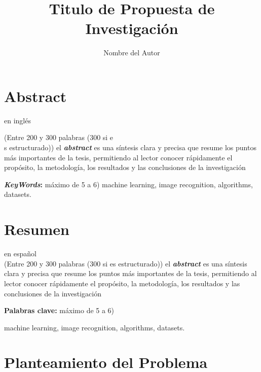 \documentclass[a4paper,12pt]{article}
\author{Nombre del Autor}
\title{Titulo de Propuesta de Investigación}
\begin{document}



\thispagestyle{empty}  %
\newpage
\tableofcontents
\newpage
\section*{Abstract} en inglés

(Entre 200 y 300 palabras (300 si e\\
s estructurado))
el \textbf{\textit{abstract}} es una síntesis clara y precisa que resume los puntos más importantes de la tesis, permitiendo al lector conocer rápidamente el propósito, la metodología, los resultados y las conclusiones de la investigación

\textbf{\textit{KeyWords}:} máximo de 5 a 6)
machine learning, image recognition, algorithms, datasets.
\section*{Resumen} en español	\\
(Entre 200 y 300 palabras (300 si es estructurado))
el \textbf{\textit{abstract}} es una síntesis clara y precisa que resume los puntos más importantes de la tesis, permitiendo al lector conocer rápidamente el propósito, la metodología, los resultados y las conclusiones de la investigación

\textbf{Palabras clave:} máximo de 5 a 6)
machine learning, image recognition, algorithms, datasets.

\section{Planteamiento del Problema}
\end{document}
